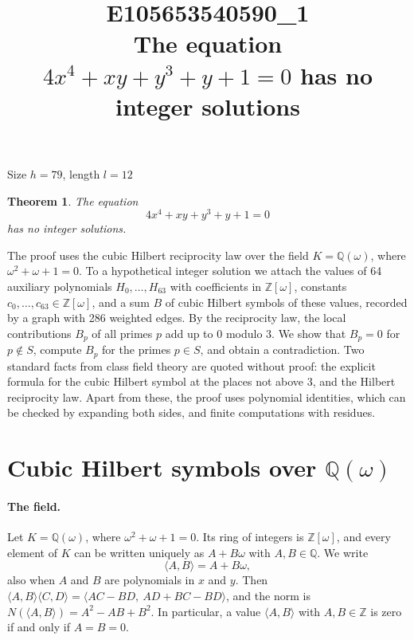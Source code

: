 \documentclass[11pt]{article}
\title{\textbf{E105653540590\_1}\\[4pt] {\Large The equation $4x^{4}+xy+y^{3}+y+1=0$ has no integer solutions}}
\author{}
\date{}
\newtheorem{theorem}{Theorem}
\newcommand{\Z}{\mathbb{Z}}
\newcommand{\Q}{\mathbb{Q}}
\begin{document}
\maketitle
\vspace{-8ex}
\begin{center}
Size $h=79$, length $l=12$
\end{center}

\begin{theorem}\label{thm:main}
The equation
\begin{equation}\label{eq:main}
4x^{4}+xy+y^{3}+y+1=0
\end{equation}
has no integer solutions.
\end{theorem}

The proof uses the cubic Hilbert reciprocity law over the field $K=\Q(\omega)$, where $\omega^2+\omega+1=0$. To a hypothetical integer solution we attach the values of 64 auxiliary polynomials $H_0,\dots,H_{63}$ with coefficients in $\Z[\omega]$, constants $c_0,\dots,c_{63}\in\Z[\omega]$, and a sum $B$ of cubic Hilbert symbols of these values, recorded by a graph with 286 weighted edges. By the reciprocity law, the local contributions $B_p$ of all primes $p$ add up to $0$ modulo $3$. We show that $B_p=0$ for $p\notin S$, compute $B_p$ for the primes $p\in S$, and obtain a contradiction. Two standard facts from class field theory are quoted without proof: the explicit formula for the cubic Hilbert symbol at the places not above $3$, and the Hilbert reciprocity law. Apart from these, the proof uses polynomial identities, which can be checked by expanding both sides, and finite computations with residues.


\section{\texorpdfstring{Cubic Hilbert symbols over $\Q(\omega)$}{Cubic Hilbert symbols over Q(w)}}\label{sec:symbols}

\paragraph{The field.} Let $K=\Q(\omega)$, where $\omega^2+\omega+1=0$. Its ring of integers is $\Z[\omega]$, and every element of $K$ can be written uniquely as $A+B\omega$ with $A,B\in\Q$. We write
\[
\langle A,B\rangle=A+B\omega,
\]
also when $A$ and $B$ are polynomials in $x$ and $y$. Then $\langle A,B\rangle\langle C,D\rangle=\langle AC-BD,\ AD+BC-BD\rangle$, and the norm is $N(\langle A,B\rangle)=A^2-AB+B^2$. In particular, a value $\langle A,B\rangle$ with $A,B\in\Z$ is zero if and only if $A=B=0$.
\end{document}
